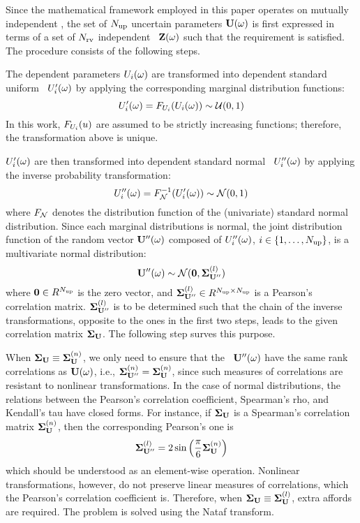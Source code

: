 Since the mathematical framework employed in this paper operates on mutually independent \rvs, the set of ${N_\text{up}}$ uncertain parameters $\mathbf{U}(\omega)$ is first expressed in terms of a set of ${N_\text{rv}}$ independent \rvs\ $\mathbf{Z}(\omega)$ such that the requirement is satisfied. The procedure consists of the following steps.

 The dependent parameters $U_i(\omega)$ are transformed into dependent standard uniform \rvs\ $U'_i(\omega)$ by applying the corresponding marginal distribution functions:
\begin{equation} \elabel{dependent-uniform}
  \U'_i(\o) = \CDF_{\U_i}(\U_i(\o)) \sim \uniform(0, 1)
\end{equation}
In this work, $F_{U_i}(u)$ are assumed to be strictly increasing functions; therefore, the transformation above is unique.

 $U'_i(\omega)$ are then transformed into dependent standard normal \rvs\ $U''_i(\omega)$ by applying the inverse probability transformation:
\begin{equation} \elabel{dependent-normal}
  \U''_i(\o) = \CDF^{-1}_\normal(\U'_i(\o)) \sim \normal(0, 1)
\end{equation}
where $F_{\mathcal{N}}$ denotes the distribution function of the (univariate) standard normal distribution. Since each marginal distributions is normal, the joint distribution function of the random vector $\mathbf{U}''(\omega)$ composed of $U''_i(\omega)$, $i \in \{ 1, \dots, {N_\text{up}} \}$, is a multivariate normal distribution:
\[
  \mathbf{U}''(\omega) \sim \mathcal{N}(\mathbf{0}, \mathbf{\Sigma}^{(l)}_{\mathbf{U}''})
\]
where $\mathbf{0} \in R^{N_\text{up}}$ is the zero vector, and $\mathbf{\Sigma}^{(l)}_{\mathbf{U}''} \in R^{{N_\text{up}} \times {N_\text{up}}}$ is a Pearson's correlation matrix. $\mathbf{\Sigma}^{(l)}_{\mathbf{U}''}$ is to be determined such that the chain of the inverse transformations, opposite to the ones in the first two steps, leads to the given correlation matrix $\mathbf{\Sigma}_{\mathbf{U}}$. The following step surves this purpose.

 When $\mathbf{\Sigma}_{\mathbf{U}} \equiv \mathbf{\Sigma}^{(n)}_{\mathbf{U}}$, we only need to ensure that the \rvs\ $\mathbf{U}''(\omega)$ have the same rank correlations as $\mathbf{U}(\omega)$, i.e., $\mathbf{\Sigma}^{(n)}_{\mathbf{U}''} = \mathbf{\Sigma}^{(n)}_{\mathbf{U}}$, since such measures of correlations are resistant to nonlinear transformations. In the case of normal distributions, the relations between the Pearson's correlation coefficient, Spearman's rho, and Kendall's tau have closed forms. For instance, if $\mathbf{\Sigma}_{\mathbf{U}}$ is a Spearman's correlation matrix $\mathbf{\Sigma}^{(n)}_{\mathbf{U}}$, then the corresponding Pearson's one is
\[
  \mathbf{\Sigma}^{(l)}_{\mathbf{U}''} = 2 \sin \left( \frac{\pi}{6} \mathbf{\Sigma}^{(n)}_{\mathbf{U}} \right)
\]
which should be understood as an element-wise operation. Nonlinear transformations, however, do not preserve linear measures of correlations, which the Pearson's correlation coefficient is. Therefore, when $\mathbf{\Sigma}_{\mathbf{U}} \equiv \mathbf{\Sigma}^{(l)}_{\mathbf{U}}$, extra affords are required. The problem is solved using the Nataf transform.

